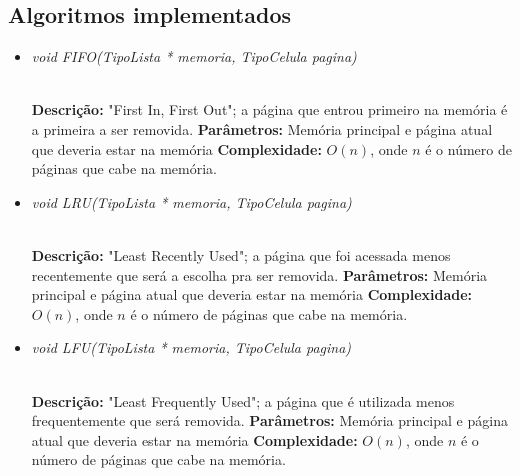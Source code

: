 \documentclass[12pt]{article}
\begin{document}
\subsection{Algoritmos implementados}

\vspace{0.2 true cm}

\begin{itemize}
 \item \begin{large}\textit{void FIFO(TipoLista * memoria, TipoCelula pagina)}\end{large}\\
 \subitem \textbf{Descrição:} "First In, First Out"; a página que entrou primeiro na memória é a primeira a ser removida.
 \subitem \textbf{Parâmetros:} Memória principal e página atual que deveria estar na memória
 \subitem \textbf{Complexidade:} $O(n)$, onde $n$ é o número de páginas que cabe na memória.
\end{itemize}

\vspace{0.2 true cm}

\begin{itemize}
 \item \begin{large}\textit{void LRU(TipoLista * memoria, TipoCelula pagina)}\end{large}\\
 \subitem \textbf{Descrição:} "Least Recently Used"; a página que foi acessada menos recentemente que será a escolha pra ser removida.
 \subitem \textbf{Parâmetros:} Memória principal e página atual que deveria estar na memória
 \subitem \textbf{Complexidade:} $O(n)$, onde $n$ é o número de páginas que cabe na memória.
\end{itemize}

\vspace{0.2 true cm}

\begin{itemize}
 \item \begin{large}\textit{void LFU(TipoLista * memoria, TipoCelula pagina)}\end{large}\\
 \subitem \textbf{Descrição:} "Least Frequently Used"; a página que é utilizada menos frequentemente que será removida.
 \subitem \textbf{Parâmetros:} Memória principal e página atual que deveria estar na memória
 \subitem \textbf{Complexidade:} $O(n)$, onde $n$ é o número de páginas que cabe na memória.
\end{itemize}
\end{document}
